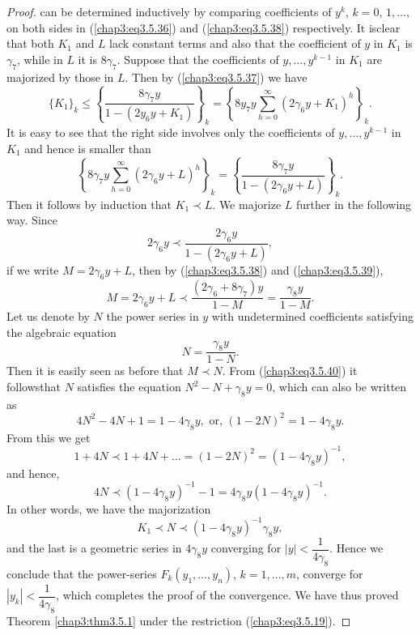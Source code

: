 \begin{proof}
can be determined inductively by comparing coefficients of $y^k$, $k =
0$, $1, \ldots, $ on both sides in (\ref{chap3:eq3.5.36}) and
(\ref{chap3:eq3.5.38}) respectively. It is\pageoriginale clear that
both $K_1$ and $L$ lack constant terms and also that the coefficient
of $y$ in $K_1$ is $\gamma_7$, while in $L$ it is $8
\gamma_7$. Suppose that the coefficients of $y, \ldots, y^{k-1}$ in
$K_1$ are majorized by those in $L$. Then by (\ref{chap3:eq3.5.37}) we
have  
$$
\{K_1\}_k \leq \left\{ \frac{8 \gamma_7 y}{1-(2y_6 y + K_1)}
\right\}_k  = \left\{8 y_7 y \sum\limits^\infty_{h=0} (2\gamma_6 y +
K_1)^h \right\}_k.  
$$
It is easy to see that the right side involves only the coefficients
of $y, \ldots, y^{k-1}$ in $K_1$ and hence is smaller than  
$$
\left\{ 8\gamma_7 y \sum\limits^\infty_{h=0} (2\gamma_6  y +
L)^h\right\}_k = \left\{ \frac{8\gamma_7 y}{1-(2\gamma_6 y + L)}
\right\}_k. 
$$
Then it follows by induction that $K_1 \prec L$. We majorize $L$
further in the following way. Since 
\begin{equation*}
2 \gamma_6 y \prec \frac{2\gamma_6 y}{1-(2\gamma_6 y + L)}, \tag{3.5.39}\label{chap3:eq3.5.39}
\end{equation*}
if we write $M = 2 \gamma_6 y + L $, then by (\ref{chap3:eq3.5.38})
and (\ref{chap3:eq3.5.39}), 
$$
M = 2 \gamma_6 y + L \prec \frac{(2\gamma_6 + 8 \gamma_7 )y}{1-M} =
\frac{\gamma_8 y}{1-M}.  
$$
Let us denote by $N$ the power series in $y$ with undetermined
coefficients satisfying the algebraic equation 
\begin{equation*}
N =\frac{\gamma_8 y}{1-N}. \tag{3.5.40}\label{chap3:eq3.5.40}
\end{equation*}
Then it is easily seen as before that $M \prec N$. From
(\ref{chap3:eq3.5.40}) it follows\pageoriginale that $N$ satisfies the
equation $N^2 - N + \gamma_8 y = 0$, which can also be written as 
$$
4 N^2 - 4 N+ 1 = 1 - 4 \gamma_8 y, \text{ or, }  (1-2N)^2 = 1-4 \gamma_8 y.
$$
From this we get
$$
1+4 N \prec 1 +4 N + \ldots = (1-2N)^2 = (1-4 \gamma_8 y)^{-1},
$$
and hence,
$$
4 N  \prec (1- 4 \gamma_8 y)^{-1} -1 = 4 \gamma_8 y (1-4 \gamma_8 y)^{-1}. 
$$
In other words, we have the majorization
$$
K_1 \prec N \prec (1-4 \gamma_8 y)^{-1} \gamma_8 y,
$$
and the last is a geometric series in $4 \gamma_8 y$ converging for
$|y| < \dfrac{1}{4 \gamma_8}$. Hence we conclude that the power-series
$F_k(y_1, \ldots, y_n)$, $k=1, \ldots, m$, converge for $|y_k| <
\dfrac{1}{4 \gamma_8}$, which completes the proof of the
convergence. We have thus proved Theorem \ref{chap3:thm3.5.1} under
the restriction (\ref{chap3:eq3.5.19}). 


\end{proof}

